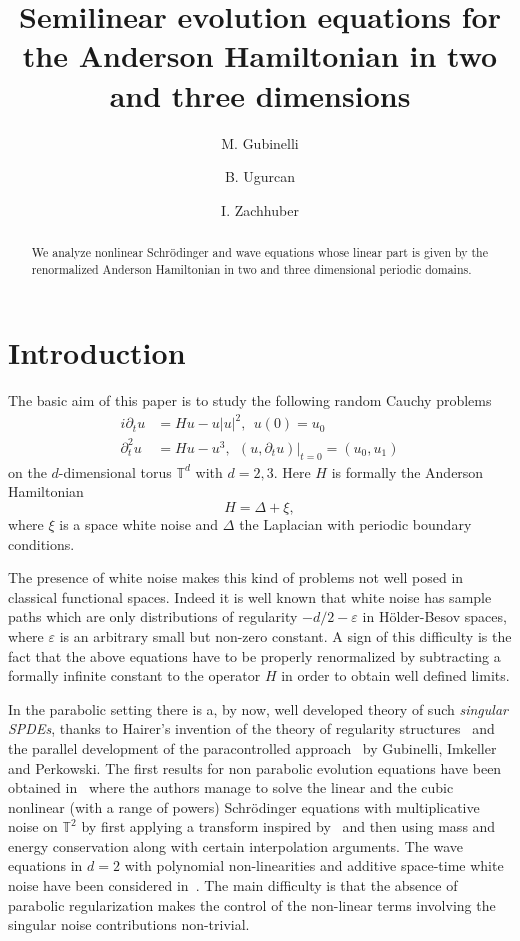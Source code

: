 \documentclass[11pt, oneside]{article}   	%
\begin{document}
\title{Semilinear evolution equations for the Anderson Hamiltonian in two and
	three dimensions}
\author{
	M. Gubinelli
	\and
	B. Ugurcan
	\and
	I. Zachhuber 
}


\maketitle
\begin{abstract}
	We analyze nonlinear Schr\"odinger and wave equations  whose linear
	part is given by the renormalized Anderson  Hamiltonian in two and three dimensional periodic domains.
\end{abstract}
{\tableofcontents}
\section{Introduction}

The basic aim of this paper is to study the following random Cauchy problems
\begin{align} 
i \partial_t u  &=H u-u|u|^2, \ \ 
u(0) =u_0 \label{equ:NLSwave1} \\ 
\partial^2_t u &=  H u - u^3, \ \  (u, \partial_t u) |_{t = 0}  =  (u_0, u_1) \label{equ:NLSwave2}
\end{align}
on the $d$-dimensional torus $\mathbb{T}^d$ with $d=2,3$. Here $H$ is formally the Anderson Hamiltonian $$H= \Delta + \xi,$$ where
$\xi$ is a space white noise and $\Delta$ the Laplacian with periodic boundary conditions. 

The presence of white noise makes this kind of problems not well posed in classical functional spaces. Indeed it is well known that white noise has sample paths which are only distributions of regularity $-d/2 - \varepsilon$ in H\"older-Besov spaces, where $\varepsilon$ is an arbitrary small but non-zero constant. A sign of this difficulty is the fact that the above equations have to be properly renormalized by subtracting a formally infinite constant to the operator $H$ in order to obtain well defined limits. 

In the parabolic setting there is a, by now, well developed theory of such \emph{singular SPDEs}, thanks to Hairer's invention of the theory of regularity structures~\cite{hairer_theory_2014} and the parallel development of the paracontrolled approach~\cite{gubinelli2015paracontrolled} by Gubinelli, Imkeller and Perkowski. The first results for non parabolic evolution equations have been obtained in~\cite{debussche2016schr} where the authors manage to solve  the linear and the cubic nonlinear (with a range of powers) Schr\"odinger equations with multiplicative noise on $\mathbb{T}^2$ by first applying a transform inspired by~\cite{HairerLabbe15} and then using mass and energy conservation along with certain interpolation arguments. The wave equations in $d=2$ with polynomial non-linearities and additive space-time white noise have been considered in~\cite{gubinelli_renormalization_2017}. The main difficulty is that the absence of parabolic regularization makes the control of the non-linear terms involving the singular noise contributions non-trivial.
\end{document}
